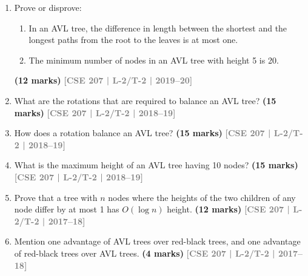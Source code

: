 \documentclass[12pt,a3paper]{article}
\newcommand{\yr}[1]{\hfill\textcolor{gray}{\small\textbf{[#1]}}}
\newcommand{\mk}[1]{\textcolor{orange!70!black}{\small\textbf{(#1 marks)}}}
\begin{document}
\begin{enumerate}
\begin{center}
\end{center}
\mk{10} \yr{CSE 207 | L-2/T-2 | 2020--21}

\item Prove or disprove: 
\begin{enumerate}
\item In an AVL tree, the difference in length between the shortest and the longest paths from the root to the leaves is at most one.
\item The minimum number of nodes in an AVL tree with height 5 is 20.
\end{enumerate}
\mk{12} \yr{CSE 207 | L-2/T-2 | 2019--20}

\item What are the rotations that are required to balance an AVL tree?
\mk{15} \yr{CSE 207 | L-2/T-2 | 2018--19}

\item How does a rotation balance an AVL tree?
\mk{15} \yr{CSE 207 | L-2/T-2 | 2018--19}

\item What is the maximum height of an AVL tree having 10 nodes?
\mk{15} \yr{CSE 207 | L-2/T-2 | 2018--19}


\item Prove that a tree with $n$ nodes where the heights of the two children of any node differ by at most 1 has $O(\log n)$ height. \mk{12}
\yr{CSE 207 | L-2/T-2 | 2017--18}


\item Mention one advantage of AVL trees over red-black trees, and one advantage of red-black trees over AVL trees. \mk{4}
\yr{CSE 207 | L-2/T-2 | 2017--18}


\end{enumerate}
\end{document}
